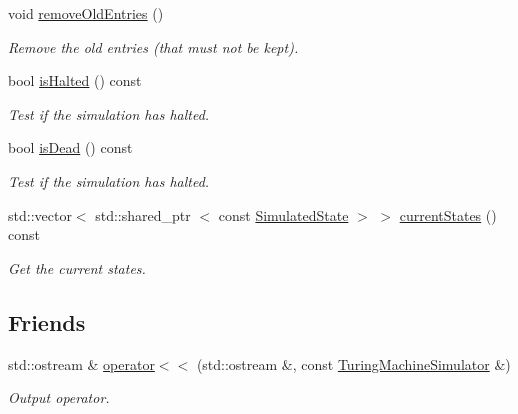 \begin{DoxyCompactItemize}
\item 
\hypertarget{classtum_1_1_turing_machine_simulator_aac5e679b8cdc8a242c734000dc3e4083}{void \hyperlink{classtum_1_1_turing_machine_simulator_aac5e679b8cdc8a242c734000dc3e4083}{remove\-Old\-Entries} ()}\label{classtum_1_1_turing_machine_simulator_aac5e679b8cdc8a242c734000dc3e4083}

\begin{DoxyCompactList}\small\item\em \-Remove the old entries (that must not be kept). \end{DoxyCompactList}\item 
bool \hyperlink{classtum_1_1_turing_machine_simulator_a7800d0eb4e79f1a8712af71b99c2d119}{is\-Halted} () const 
\begin{DoxyCompactList}\small\item\em \-Test if the simulation has halted. \end{DoxyCompactList}\item 
bool \hyperlink{classtum_1_1_turing_machine_simulator_a80cc9dfdb96ef5d62e402c25be751616}{is\-Dead} () const 
\begin{DoxyCompactList}\small\item\em \-Test if the simulation has halted. \end{DoxyCompactList}\item 
std\-::vector$<$ std\-::shared\-\_\-ptr\*
$<$ const \hyperlink{classtum_1_1_simulated_state}{\-Simulated\-State} $>$ $>$ \hyperlink{classtum_1_1_turing_machine_simulator_a42cee751c5e02c8dd2145622ce211e93}{current\-States} () const 
\begin{DoxyCompactList}\small\item\em \-Get the current states. \end{DoxyCompactList}\end{DoxyCompactItemize}
\subsection*{\-Friends}
\begin{DoxyCompactItemize}
\item 
\hypertarget{classtum_1_1_turing_machine_simulator_a6b36101943d9b23ab9513d83897ba6ea}{std\-::ostream \& \hyperlink{classtum_1_1_turing_machine_simulator_a6b36101943d9b23ab9513d83897ba6ea}{operator$<$$<$} (std\-::ostream \&, const \hyperlink{classtum_1_1_turing_machine_simulator}{\-Turing\-Machine\-Simulator} \&)}\label{classtum_1_1_turing_machine_simulator_a6b36101943d9b23ab9513d83897ba6ea}

\begin{DoxyCompactList}\small\item\em \-Output operator. \end{DoxyCompactList}\end{DoxyCompactItemize}


